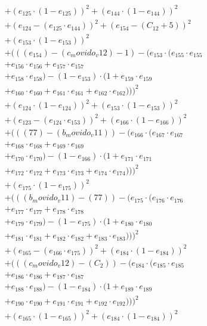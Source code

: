 \documentclass[10pt, a4paper]{article}
\begin{document}
\begin{align*}
& + (e_{125} \cdot (1 - e_{125}))^{2} + (e_{144} \cdot (1 - e_{144}))^{2} \\
& + (e_{124} - (e_{125} \cdot e_{144}))^{2} + (e_{154} - (C_{12} + 5))^{2} \\
& + (e_{153} \cdot (1 - e_{153}))^{2} \\
& + (((e_{154}) - (c_movido_v12) - 1) - (e_{153} \cdot (e_{155} \cdot e_{155} \\
& + e_{156} \cdot e_{156} + e_{157} \cdot e_{157} \\
& + e_{158} \cdot e_{158}) - (1 - e_{153}) \cdot (1 + e_{159} \cdot e_{159} \\
& + e_{160} \cdot e_{160} + e_{161} \cdot e_{161} + e_{162} \cdot e_{162})))^{2} \\
& + (e_{124} \cdot (1 - e_{124}))^{2} + (e_{153} \cdot (1 - e_{153}))^{2} \\
& + (e_{123} - (e_{124} \cdot e_{153}))^{2} + (e_{166} \cdot (1 - e_{166}))^{2} \\
& + (((77) - (b_movido_v11)) - (e_{166} \cdot (e_{167} \cdot e_{167} \\
& + e_{168} \cdot e_{168} + e_{169} \cdot e_{169} \\
& + e_{170} \cdot e_{170}) - (1 - e_{166}) \cdot (1 + e_{171} \cdot e_{171} \\
& + e_{172} \cdot e_{172} + e_{173} \cdot e_{173} + e_{174} \cdot e_{174})))^{2} \\
& + (e_{175} \cdot (1 - e_{175}))^{2} \\
& + (((b_movido_v11) - (77)) - (e_{175} \cdot (e_{176} \cdot e_{176} \\
& + e_{177} \cdot e_{177} + e_{178} \cdot e_{178} \\
& + e_{179} \cdot e_{179}) - (1 - e_{175}) \cdot (1 + e_{180} \cdot e_{180} \\
& + e_{181} \cdot e_{181} + e_{182} \cdot e_{182} + e_{183} \cdot e_{183})))^{2} \\
& + (e_{165} - (e_{166} \cdot e_{175}))^{2} + (e_{184} \cdot (1 - e_{184}))^{2} \\
& + (((c_movido_v12) - (C_{2})) - (e_{184} \cdot (e_{185} \cdot e_{185} \\
& + e_{186} \cdot e_{186} + e_{187} \cdot e_{187} \\
& + e_{188} \cdot e_{188}) - (1 - e_{184}) \cdot (1 + e_{189} \cdot e_{189} \\
& + e_{190} \cdot e_{190} + e_{191} \cdot e_{191} + e_{192} \cdot e_{192})))^{2} \\
& + (e_{165} \cdot (1 - e_{165}))^{2} + (e_{184} \cdot (1 - e_{184}))^{2} \\

\end{align*}
\end{document}

